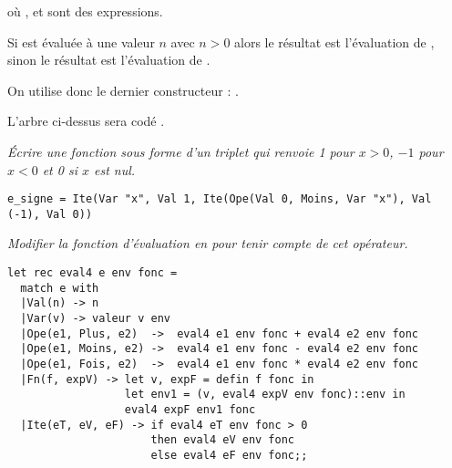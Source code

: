 où ,  et  sont des expressions.

Si  est évaluée à une valeur $n$ avec $n > 0$ alors le résultat est l'évaluation de , sinon le résultat est l'évaluation de .

On utilise donc le dernier constructeur : .

L'arbre ci-dessus sera codé .
\begin{Exercise}\it
Écrire une fonction  sous forme d'un triplet  qui renvoie 1 pour $x > 0$, $-1$ pour $x < 0$ et 0 si $x$ est nul.
\end{Exercise}
\begin{Answer}
\begin{lstlisting}
e_signe = Ite(Var "x", Val 1, Ite(Ope(Val 0, Moins, Var "x"), Val (-1), Val 0))      
\end{lstlisting} 
\end{Answer}
\begin{Exercise}\it
Modifier la fonction d'évaluation en  pour tenir compte de cet opérateur.
\end{Exercise}
\begin{Answer}
\begin{lstlisting}
let rec eval4 e env fonc =
  match e with
  |Val(n) -> n
  |Var(v) -> valeur v env
  |Ope(e1, Plus, e2)  ->  eval4 e1 env fonc + eval4 e2 env fonc
  |Ope(e1, Moins, e2) ->  eval4 e1 env fonc - eval4 e2 env fonc
  |Ope(e1, Fois, e2)  ->  eval4 e1 env fonc * eval4 e2 env fonc
  |Fn(f, expV) -> let v, expF = defin f fonc in
                  let env1 = (v, eval4 expV env fonc)::env in
                  eval4 expF env1 fonc
  |Ite(eT, eV, eF) -> if eval4 eT env fonc > 0
                      then eval4 eV env fonc
                      else eval4 eF env fonc;;
\end{lstlisting} 
\end{Answer}
\bigskip

